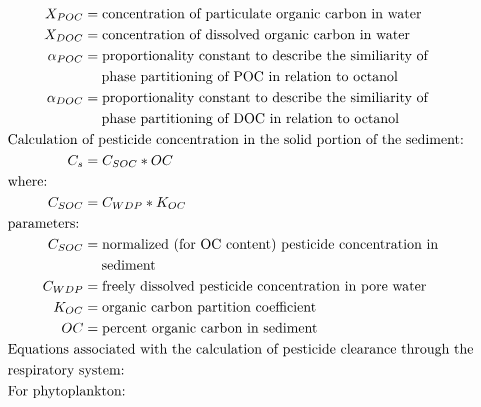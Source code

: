 \documentclass[10pt]{article}
\begin{document}
\begin{align*}
X_{POC} & = \text{concentration of particulate organic carbon in water} \nonumber \\
X_{DOC} & = \text{concentration of dissolved organic carbon in water} \nonumber \\
\alpha_{POC} & = \text{proportionality constant to describe the similiarity of}\nonumber\\ &\hspace{1.3em} \text{phase partitioning of POC in relation to octanol}\nonumber\\
\alpha_{DOC} & = \text{proportionality constant to describe the similiarity of}\nonumber\\ &\hspace{1.3em} \text{phase partitioning of DOC in relation to octanol}\nonumber\\
&    \hspace{-.75in}  \text{Calculation of pesticide concentration in the solid portion of the sediment:} \nonumber \\
C_{s} & = C_{SOC} * OC \nonumber \\
&    \hspace{-.75in}  \text{where:} \nonumber \\
C_{SOC} & = C_{WDP} * K_{OC}\nonumber \\
&    \hspace{-.75in}  \text{parameters:} \nonumber \\
C_{SOC} & = \text{normalized (for OC content) pesticide concentration in}\nonumber \\ &\hspace{1.3em} \text{sediment} \nonumber \\
C_{WDP} & = \text{freely dissolved pesticide concentration in pore water} \nonumber \\
K_{OC} & = \text{organic carbon partition coefficient} \nonumber\\
OC & = \text{percent organic carbon in sediment} \nonumber\\
&    \hspace{-.75in}  \text{Equations associated with the calculation of pesticide clearance through the}\nonumber\\ &\hspace{-0.75in} \text{respiratory system:}\nonumber\\ 
&    \hspace{-.75in}  \text{For phytoplankton:} \nonumber \\

\end{align*}
\end{document}
